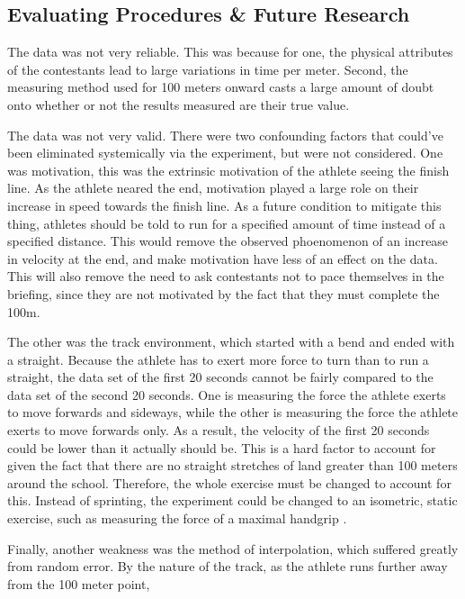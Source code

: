 \documentclass[index]{subfiles}
\begin{document}
\subsection{Evaluating Procedures & Future Research}

The data was not very reliable. This was because for one, the physical attributes of the contestants lead to large variations in time per meter. Second, the measuring method used for 100 meters onward casts a large amount of doubt onto whether or not the results measured are their true value. 

The data was not very valid. There were two confounding factors that could've been eliminated systemically via the experiment, but were not considered. One was motivation, this was the extrinsic motivation of the athlete seeing the finish line. As the athlete neared the end, motivation played a large role on their increase in speed towards the finish line. As a future condition to mitigate this thing, athletes should be told to run for a specified amount of time instead of a specified distance. This would remove the observed phoenomenon of an increase in velocity at the end, and make motivation have less of an effect on the data. This will also remove the need to ask contestants not to pace themselves in the briefing, since they are not motivated by the fact that they must complete the 100m.

The other was the track environment, which started with a bend and ended with a straight. Because the athlete has to exert more force to turn than to run a straight, the data set of the first 20 seconds cannot be fairly compared to the data set of the second 20 seconds. One is measuring the force the athlete exerts to move forwards and sideways, while the other is measuring the force the athlete exerts to move forwards only. As a result, the velocity of the first 20 seconds could be lower than it actually should be. This is a hard factor to account for given the fact that there are no straight stretches of land greater than 100 meters around the school. Therefore, the whole exercise must be changed to account for this. Instead of sprinting, the experiment could be changed to an isometric, static exercise, such as measuring the force of a maximal handgrip \parencite{kurosawaCreatineSupplementationEnhances2003}. 

Finally, another weakness was the method of interpolation, which suffered greatly from random error. By the nature of the track, as the athlete runs further away from the 100 meter point, 
\end{document}
